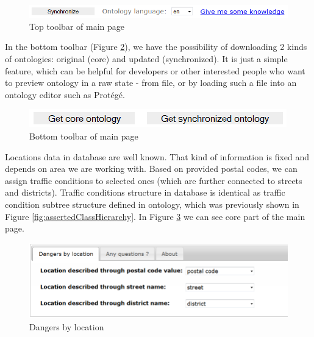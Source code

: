 \medskip

\begin{figure}[htp]
\centering
\includegraphics[scale=0.6]{images/chapter4/BoardTopToolbar}
\caption{Top toolbar of main page}
\label{fig:boardTopToolbar}
\end{figure}

\noindent In the bottom toolbar (Figure \ref{fig:boardBottomToolbar}), we have the possibility of downloading 2 kinds of ontologies: original (core) and updated (synchronized). It is just a simple feature, which can be helpful for developers or other interested people who want to preview ontology in a raw state - from file, or by loading such a file into an ontology editor such as Protégé.

\medskip

\begin{figure}[htp]
\centering
\includegraphics[scale=0.6]{images/chapter4/BoardBottomToolbar}
\caption{Bottom toolbar of main page}
\label{fig:boardBottomToolbar}
\end{figure}

\noindent Locations data in database are well known. That kind of information is fixed and depends on area we are working with. Based on provided postal codes, we can assign traffic conditions to selected ones (which are further connected to streets and districts). Traffic conditions structure in database is identical as traffic condition subtree structure defined in ontology, which was previously shown in Figure \ref{fig:assertedClassHierarchy}. In Figure \ref{fig:boardMain} we can see core part of the main page.

\medskip

\begin{figure}[htp]
\centering
\includegraphics[scale=0.55]{images/chapter4/BoardMain}
\caption{Dangers by location}
\label{fig:boardMain}
\end{figure}

